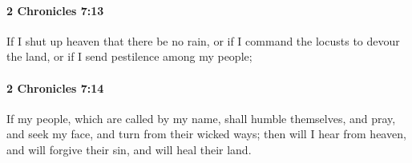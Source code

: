 		\paragraph{2 Chronicles 7:13} %
			\label{2CHRONICLES-7-13}

			If I shut up heaven that there be no rain, or if I command the locusts to devour the land, or if I send pestilence among my people;


		\paragraph{2 Chronicles 7:14} %
			\label{2CHRONICLES-7-14}

			If my people, which are called by my name, shall humble themselves, and pray, and seek my face, and turn from their wicked ways; then will I hear from heaven, and will forgive their sin, and will heal their land.


